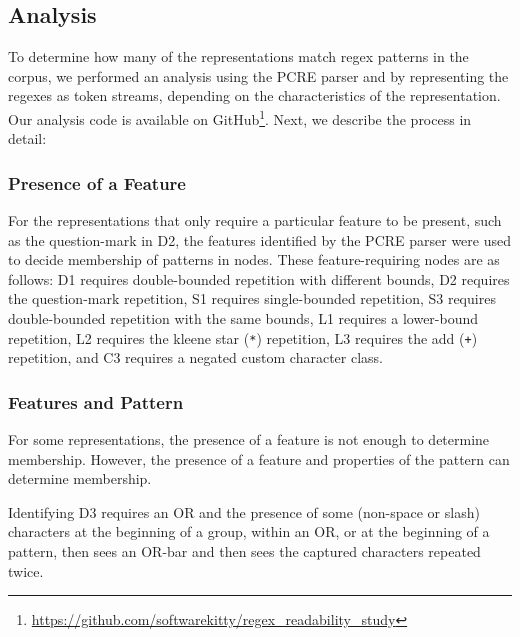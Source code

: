 





\subsection{Analysis}
\label{communityanalysis}
To determine how many of the representations match regex patterns in the corpus, we performed an analysis using the PCRE parser and by representing the regexes as token streams, depending on the characteristics of the representation. Our analysis code is available on GitHub\footnote{\url{https://github.com/softwarekitty/regex_readability_study}}. Next, we describe the process in detail: 

\subsubsection{Presence of a Feature}
For the representations that only require a particular feature to be present, such as the question-mark in D2, the features identified by the PCRE parser were used to decide membership of patterns in nodes.  
These feature-requiring nodes are as follows: D1 requires double-bounded repetition with different bounds, D2 requires the question-mark repetition, S1 requires single-bounded repetition, S3 requires double-bounded repetition with the same bounds,  L1 requires a lower-bound repetition, L2 requires the kleene star (\verb!*!) repetition, L3 requires the add (\verb!+!) repetition, and C3 requires a negated custom character class.

\subsubsection{Features  and Pattern}
For some representations, the presence of a feature is not enough to determine membership. 
However,  the presence of a feature and properties of the pattern can determine membership.  


Identifying D3 requires an OR and the presence of some (non-space or slash) characters at the beginning of a group, within an OR, or at the beginning of a pattern, then sees an OR-bar and then sees the captured characters repeated twice. 

